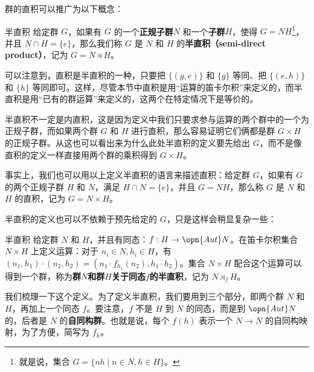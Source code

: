 群的直积可以推广为以下概念：

\begin{definition}{半直积}
给定群 $G$，如果有 $G$ 的一个\textbf{正规子群}$N$ 和一个\textbf{子群}$H$，使得 $G = N H$\footnote{就是说，集合 $G= \{n h \mid n \in N, h\in H\}$。}，并且 $N \cap H = \{e\}$，那么我们称 $G$ 是 $N$ 和 $H$ 的\textbf{半直积（semi-direct product）}，记为 $G = N \rtimes H$。
\end{definition}

可以注意到，直积是半直积的一种，只要把 $\{(g, e)\}$ 和 $\{g\}$ 等同、把 $\{(e, h)\}$ 和 $\{h\}$ 等同即可。这样，尽管本节中直积是用“运算的笛卡尔积”来定义的，而半直积是用“已有的群运算”来定义的，这两个在特定情况下是等价的。

半直积不一定是内直积，这是因为定义中我们只要求参与运算的两个群中的一个为正规子群，而如果两个群 $G$ 和 $H$ 进行直积，那么容易证明它们俩都是群 $G\times H$ 的正规子群。从这也可以看出来为什么此处半直积的定义要先给出 $G$，而不是像直积的定义一样直接用两个群的乘积得到 $G\times H$。

事实上，我们也可以用以上定义半直积的语言来描述直积：给定群 $G$，如果有 $G$ 的两个正规子群 $H$ 和 $N$，满足 $H\cap N=\{e\}$，并且 $G=NH$，那么称 $G$ 是 $N$ 和 $H$ 的直积，记为 $G=N\times H$。

半直积的定义也可以不依赖于预先给定的 $G$，只是这样会稍显复杂一些：

\begin{definition}{半直积}
给定群 $N$ 和 $H$，并且有同态：$f:H\rightarrow \opn{Aut}N$。在笛卡尔积集合 $N\times H$ 上定义运算：对于 $n_i\in N, h_i\in H$，有 $(n_1, h_1)\cdot(n_2, h_2)=(n_1\cdot f_{h_1}(n_2), h_1\cdot h_2)$。集合 $N\times H$ 配合这个运算可以得到一个群，称为\textbf{群}$N$\textbf{和群}$H$\textbf{关于同态}$f$\textbf{的半直积}，记为 $N\rtimes_fH$。
\end{definition}

我们梳理一下这个定义。为了定义半直积，我们要用到三个部分，即两个群 $N$ 和 $H$，再加上一个同态 $f$。要注意，$f$ 不是 $H$ 到 $N$ 的同态，而是到 $\opn{Aut} N$ 的，后者是 $N$ 的\textbf{自同构群}。也就是说，每个 $f(h)$ 表示一个 $N\rightarrow N$ 的自同构映射，为了方便，简写为 $f_h$。













